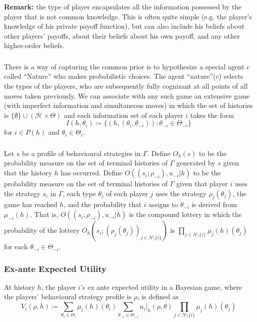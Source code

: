 \documentclass[UTF8,11pt,colorlinks,compress,openany]{beamer}%
\begin{document}
\begin{frame}\frametitle{}
\textbf{Remark:} the type of player encapsulates all the information possessed by the player that is not common knowledge. This is often quite simple (e.g. the player's knowledge of his private payoff function), but can also include his beliefs about other players' payoffs, about their beliefs about his own payoff, and any other higher-order beliefs.
\end{frame}

\begin{frame}\frametitle{}
There is a way of capturing the common prior is to hypothesize a special agent $c$ called ``Nature'' who makes probabilistic choices.
The agent ``nature''($c$) selects the types of the players, who are subsequently fully cognizant at all points of all moves taken previously. We can associate with any such game an extensive game (with imperfect information and simultaneous moves) in which the set of histories is $\{\emptyset\}\cup(\mathcal{H}\times\Theta)$ and each information set of each player $i$ takes the form
\[I(h,\theta_i)\coloneqq \{(h,(\theta_i,\theta_{-i})):\theta_{-i}\in\Theta_{-i}\}\]
for $i\in P(h)$ and $\theta_i\in\Theta_i$.
\end{frame}

\begin{frame}\frametitle{}
Let $s$ be a profile of behavioural strategies in $\Gamma$. Define $O_h(s)$ to be the probability measure on the set of terminal histories of $\Gamma$ generated by $s$ given that the history $h$ has occurred. Define $O((s_i;\rho_{-i}),u_{-i}|h)$ to be the probability measure on the set of terminal histories of $\Gamma$ given that player $i$ uses the strategy $s_i$ in $\Gamma$, each type $\theta_j$ of each player $j$ uses the strategy $\rho_j(\theta_j)$, the game has reached $h$, and
the probability that $i$ assigns to $\theta_{-i}$ is derived from $\mu_{-i}(h)$. That is, $O((s_i;\rho_{-i}),u_{-i}|h)$ is the compound lottery in which the probability of the lottery $O_h(s_i;(\rho_j(\theta_j))_{j\in N\setminus\{i\}})$ is $\prod\limits_{j\in N\setminus\{i\}}\mu_j(h)(\theta_j)$ for each $\theta_{-i}\in\Theta_{-i}$.
\end{frame}

\begin{frame}\frametitle{Ex-ante Expected Utility}
\begin{definition}
	At history $h$, the player $i$'s ex ante expected utility in a Bayesian game, where the players' behavioural strategy profile is $\rho$, is defined as
	\[V_i(\rho,h)\coloneqq \sum\limits_{\theta_i\in\Theta_i}\mu_i(h)(\theta_i)\sum\limits_{\theta_{-i}\in\Theta_{-i}}u_i|_h(\rho,\theta)\prod\limits_{j\in N\setminus\{i\}}\mu_j(h)(\theta_j)\]
\end{definition}
\end{frame}
\end{document}
